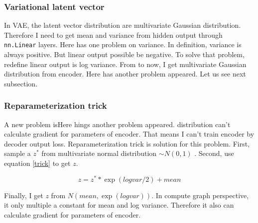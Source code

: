 \documentclass[12pt]{article}
\begin{document}
\subsubsection{Variational latent vector}

In VAE, the latent vector distribution are multivariate Gaussian distribution. Therefore I need to get mean and variance from hidden output through \verb|nn.Linear| layers. Here has one problem on variance. In definition, variance is always positive. But linear output possible be negative. To solve that problem, redefine linear output is log variance. From to now, I get multivariate Gaussian distribution from encoder. Here has another problem appeared. Let us see next subsection.

\subsubsection{Reparameterization trick}

A new problem isHere hings another problem appeared. distribution can't calculate gradient for parameters of encoder. That means I can't train encoder by decoder output loss. Reparameterization trick is solution for this problem. First, sample a $z^*$ from multivariate normal distribution $\sim N(0,1)$ . Second, use equation \ref{trick} to get $z$.

\begin{equation}
\label{trick}
z = z^* * \exp(logvar/2) + mean
\end{equation} 

Finally, I get $z$ from $N(mean, \exp(logvar))$. In compute graph perspective, it only multiple a constant for mean and log variance. Therefore it also can calculate gradient for parameters of encoder.
\end{document}
